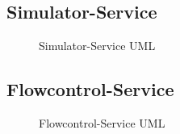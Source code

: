 \subsection{Simulator-Service}

\begin{figure}[!ht]
    \centering
    \caption{Simulator-Service UML}
    \label{fig:simulator-service}
\end{figure}

\subsection{Flowcontrol-Service}

\begin{figure}[!ht]
    \centering
    \caption{Flowcontrol-Service UML}
    \label{fig:flowcontrol-service}
\end{figure}
